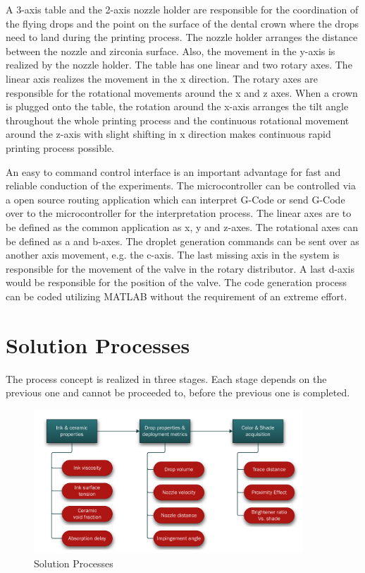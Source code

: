 A 3-axis table and the 2-axis nozzle holder are responsible for the coordination of the flying drops and the point on the surface of the dental crown where the drops need to land during the printing process. The nozzle holder arranges the distance between the nozzle and zirconia surface. Also, the movement in the y-axis is realized by the nozzle holder. The table has one linear and two rotary axes. The linear axis realizes the movement in the x direction. The rotary axes are responsible for the rotational movements around the x and z axes. When a crown is plugged onto the table, the rotation around the x-axis arranges the tilt angle throughout the whole printing process and the continuous rotational movement around the z-axis with slight shifting in x direction makes continuous rapid printing process possible. 

An easy to command control interface is an important advantage for fast and reliable conduction of the experiments. The microcontroller can be controlled via a open source routing application which can interpret G-Code or send G-Code over to the microcontroller for the interpretation process. The linear axes are to be defined as the common application as x, y and z-axes. The rotational axes can be defined as a and b-axes. The droplet generation commands can be sent over as another axis movement, e.g. the c-axis. The last missing axis in the system is responsible for the movement of the valve in the rotary distributor. A last d-axis would be responsible for the position of the valve. The code generation process can be coded utilizing MATLAB without the requirement of an extreme effort.


\chapter{Solution Processes}
\label{sec:Lösungsprozesse}
The process concept is realized in three stages. Each stage depends on the previous one and cannot be proceeded to, before the previous one is completed.

\bigskip
\bigskip
\bigskip
\space
\bigskip

\begin{figure}[H]
	\centering
	\includegraphics[width=0.9\textwidth]{grafiken/SolutionProcesses.jpg}
	\caption{Solution Processes}
	\label{fig:SolutionProcesses}
\end{figure} 

